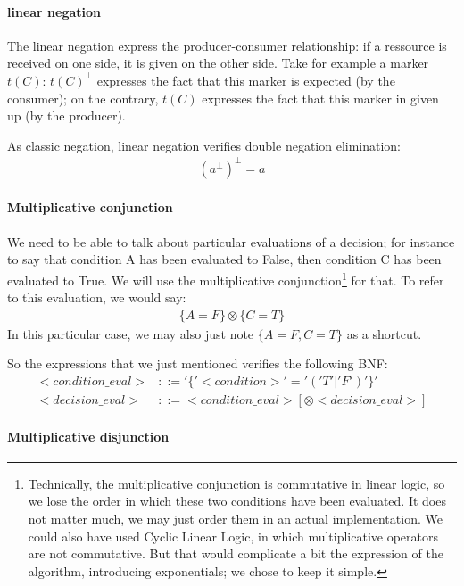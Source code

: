\documentclass[a4paper,12pt,twoside]{article}
\begin{document}
\paragraph{linear negation}

The linear negation express the producer-consumer relationship: if a
ressource is received on one side, it is given on the other side. Take
for example a marker $t(C)$: $t(C)^\bot$ expresses the fact that this
marker is expected (by the consumer); on the contrary, $t(C)$
expresses the fact that this marker in given up (by the producer).

As classic negation, linear negation verifies double negation elimination:
\begin{align*}
 (a^\bot)^\bot = a
\end{align*}


\paragraph{Multiplicative conjunction}

We need to be able to talk about particular evaluations of a decision;
for instance to say that condition A has been evaluated to False, then
condition C has been evaluated to True. We will use the multiplicative
conjunction\footnote{Technically, the multiplicative conjunction is
commutative in linear logic, so we lose the order in which these two
conditions have been evaluated.  It does not matter much, we may just
order them in an actual implementation.  We could also have used
Cyclic Linear Logic, in which multiplicative operators are not
commutative. But that would complicate a bit the expression of the
algorithm, introducing exponentials; we chose to keep it simple.} for
that. To refer to this evaluation, we would say:
\begin{align*}
 \{A=F\} \otimes \{C=T\}
\end{align*}
In this particular case, we may also just note $\{A=F, C=T\}$ as a shortcut.

So the expressions that we just mentioned verifies the following BNF:
\begin{align*}
<condition\_eval> & ::= '\{' <condition> '=' ('T' | 'F') '\}'\\
<decision\_eval>  & ::= <condition\_eval> [ \otimes <decision\_eval> ]
\end{align*}

\paragraph{Multiplicative disjunction}
\end{document}
